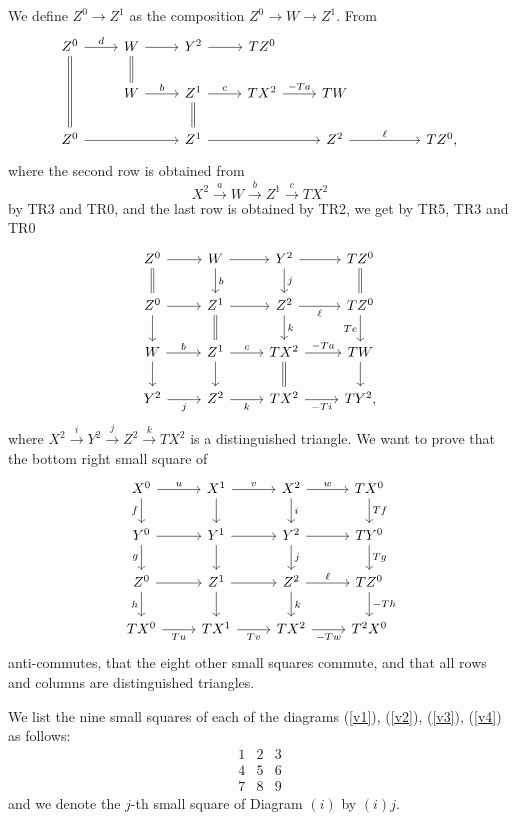 \documentclass[12pt]{article}
\theoremstyle{remark}
\theoremstyle{definition}
\begin{document}
%
We define $Z^0\to Z^1$ as the composition $Z^0\to W\to Z^1$. From 
$$
\begin{tikzcd}
Z^0\ar[equal]{dd}\ar{r}{d}&W\ar[equal]{d}\ar{r}&Y^2\ar{r}&TZ^0\\
&W\ar{r}{b}&Z^1\ar[equal]{d}\ar{r}{c}&TX^2\ar{r}{-Ta}&TW\\
Z^0\ar{rr}&&Z^1\ar{rr}&&Z^2\ar{rr}{\ell}&&TZ^0,
\end{tikzcd}
$$
where the second row is obtained from 
$$
X^2\overset{a}{\to}W\overset{b}{\to}Z^1\overset{c}{\to}TX^2
$$
by TR3 and TR0, and the last row is obtained by TR2, we get by TR5, TR3 and TR0
%
\begin{equation}\label{v3}
\begin{tikzcd}
Z^0\ar{r}\ar[equal]{d}&W\ar{d}{b}\ar{r}&Y^2\ar{d}{j}\ar{r}&TZ^0\ar[equal]{d}\\
Z^0\ar{d}\ar{r}&Z^1\ar{r}\ar[equal]{d}&Z^2\ar{d}{k}\ar{r}[swap]{\ell}&TZ^0\ar{d}[swap]{Te}\\
W\ar{d}\ar{r}{b}&Z^1\ar{d}\ar{r}{c}&TX^2\ar{r}{-Ta}\ar[equal]{d}&TW\ar{d}\\
Y^2\ar{r}[swap]{j}&Z^2\ar{r}[swap]{k}&TX^2\ar{r}[swap]{-Ti}&TY^2,
\end{tikzcd}
\end{equation}
%
where $X^2\overset{i}{\to}Y^2\overset{j}{\to}Z^2\overset{k}{\to}TX^2$ is a distinguished triangle. We want to prove that the bottom right small square of 
%
\begin{equation}\label{v4}
\begin{tikzcd}
X^0\ar{r}{u}\ar{d}[swap]{f}&X^1\ar{d}\ar{r}{v}&X^2\ar{d}{i}\ar{r}{w}&TX^0\ar{d}{Tf}\\ 
Y^0\ar{r}\ar{d}[swap]{g}&Y^1\ar{d}\ar{r}&Y^2\ar{d}{j}\ar{r}&TY^0\ar{d}{Tg}\\ 
Z^0\ar{r}\ar{d}[swap]{h}&Z^1\ar{d}\ar{r}&Z^2\ar{d}{k}\ar{r}{\ell}&TZ^0\ar{d}{-Th}\\ 
TX^0\ar{r}[swap]{Tu}&TX^1\ar{r}[swap]{Tv}&TX^2\ar{r}[swap]{-Tw}&T^2X^0
\end{tikzcd}
\end{equation}
%
anti-commutes, that the eight other small squares commute, and that all rows and columns are distinguished triangles.

We list the nine small squares of each of the diagrams (\ref{v1}), (\ref{v2}), (\ref{v3}), (\ref{v4}) as follows:
$$
\begin{matrix}1&2&3\\ 4&5&6\\ 7&8&9
\end{matrix}
$$ 
and we denote the $j$-th small square of Diagram $(i)$ by $(i)j$. 
\end{document}
